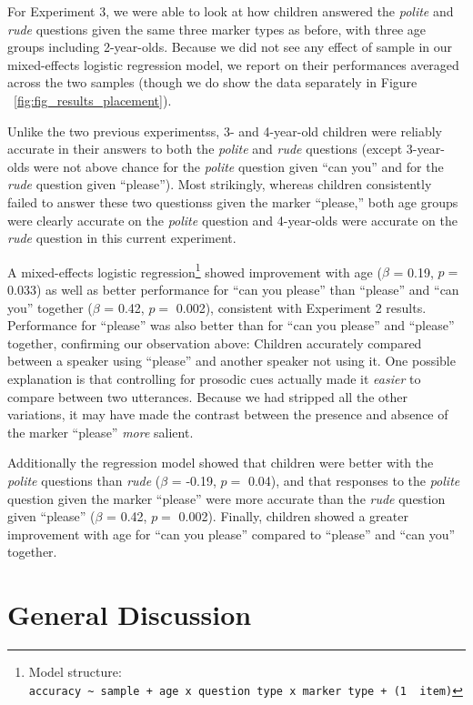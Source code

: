 \documentclass[10pt, letterpaper]{article}
\begin{document}
For Experiment 3, we were able to look at how children answered the
\emph{polite} and \emph{rude} questions given the same three marker
types as before, with three age groups including 2-year-olds. Because we
did not see any effect of sample in our mixed-effects logistic
regression model, we report on their performances averaged across the
two samples (though we do show the data separately in Figure
~\ref{fig:fig_results_placement}).

Unlike the two previous experimentss, 3- and 4-year-old children were
reliably accurate in their answers to both the \emph{polite} and
\emph{rude} questions (except 3-year-olds were not above chance for the
\emph{polite} question given ``can you'' and for the \emph{rude}
question given ``please''). Most strikingly, whereas children
consistently failed to answer these two questionss given the marker
``please,'' both age groups were clearly accurate on the \emph{polite}
question and 4-year-olds were accurate on the \emph{rude} question in
this current experiment.

A mixed-effects logistic regression\footnote{Model structure:
  \texttt{accuracy\ \textasciitilde{}\ sample\ +\ age\ x\ question\ type\ x\ marker\ type\ +\ (1\ \textbar{}\ item)}}
showed improvement with age (\(\beta\) = 0.19, \(p =\) 0.033) as well as
better performance for ``can you please'' than ``please'' and ``can
you'' together (\(\beta\) = 0.42, \(p =\) 0.002), consistent with
Experiment 2 results. Performance for ``please'' was also better than
for ``can you please'' and ``please'' together, confirming our
observation above: Children accurately compared between a speaker using
``please'' and another speaker not using it. One possible explanation is
that controlling for prosodic cues actually made it \emph{easier} to
compare between two utterances. Because we had stripped all the other
variations, it may have made the contrast between the presence and
absence of the marker ``please'' \emph{more} salient.

Additionally the regression model showed that children were better with
the \emph{polite} questions than \emph{rude} (\(\beta\) = -0.19, \(p =\)
0.04), and that responses to the \emph{polite} question given the marker
``please'' were more accurate than the \emph{rude} question given
``please'' (\(\beta\) = 0.42, \(p =\) 0.002). Finally, children showed a
greater improvement with age for ``can you please'' compared to
``please'' and ``can you'' together.

\section{General Discussion}\label{general-discussion}
\end{document}
